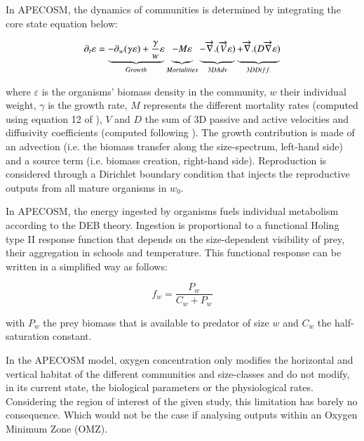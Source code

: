 In APECOSM, the dynamics of communities is determined by integrating the core state equation below:

\begin{equation}
\partial_t \varepsilon = \underbrace{- \partial_w(\gamma \varepsilon) + \frac{\gamma}{w}\varepsilon}_{Growth} 
\underbrace{- M \varepsilon \vphantom{\frac{\gamma}{w}\varepsilon}}_{Mortalities}
\underbrace{-\overrightarrow{\nabla}.(\overrightarrow{V} \varepsilon) \vphantom{\frac{\gamma}{w}\varepsilon}}_{3D Adv} 
\underbrace{+ \overrightarrow{\nabla} . (D \overrightarrow{\nabla} \varepsilon) \vphantom{\frac{\gamma}{w}\varepsilon}}_{3D Diff.}
\label{eq:apecosm_trend}
\end{equation}

where $\varepsilon$  is the organisms' biomass density in the community, $w$ their individual weight, $\gamma$ is the growth rate, $M$ represents the different mortality rates (computed using equation 12 of \citealt{mauryIndividualsPopulationsCommunities2013}), $V$ and $D$ the sum of 3D passive and active velocities and diffusivity coefficients (computed following \citealt{faugerasAdvectiondiffusionreactionSizestructuredFish2005}). The growth contribution is made of an advection (i.e. the biomass transfer along the size-spectrum, left-hand side) and a source term (i.e. biomass creation, right-hand side). Reproduction is considered through a Dirichlet boundary condition that injects the reproductive outputs from all mature organisms in $w_0$.

In APECOSM, the energy ingested by organisms fuels individual metabolism according to the DEB theory. Ingestion is proportional to a functional Holing type II response function that depends on the size-dependent visibility of prey, their aggregation in schools and temperature. This functional response can be written in a simplified way as follows:

\begin{equation}
f_{w} = \frac{P_{w}}{C_{w} + P_{w}}
\label{eq:repfonct}
\end{equation}

with $P_{w}$ the prey biomass that is available to predator of size $w$ and $C_{w}$ the half-saturation constant.

In the APECOSM model, oxygen concentration only modifies the horizontal and vertical habitat of the different communities and size-classes and do not modify, in its current state, the  biological parameters or the physiological rates. Considering the region of interest of the given study, this limitation has barely no consequence. Which would not be the case if analysing outputs within an Oxygen Minimum Zone (OMZ). 

